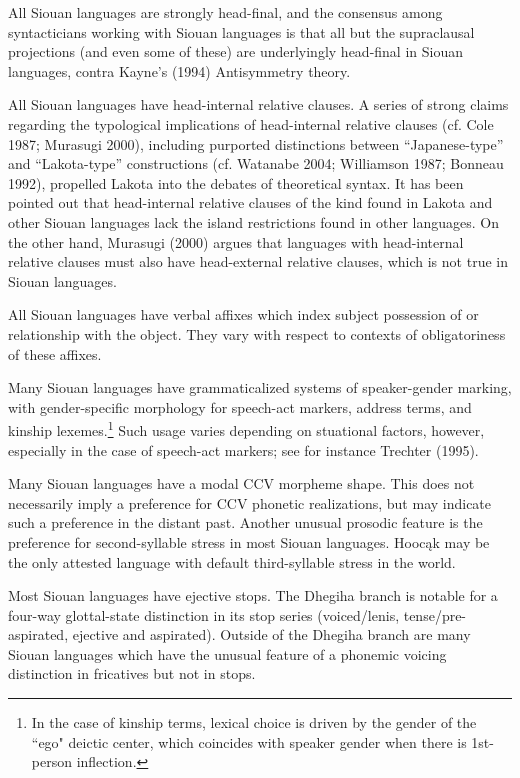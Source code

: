 \begin{refsection}
All Siouan languages are strongly head-final, and the consensus among syntacticians working with Siouan languages is that all but the supraclausal projections (and even some of these) are underlyingly head-final in Siouan languages, contra Kayne's (1994) Antisymmetry theory.


All Siouan languages have head-internal relative clauses. A series of strong claims regarding the typological implications of head-internal relative clauses (cf. Cole 1987; Murasugi 2000), including purported distinctions between ``Japanese-type'' and ``Lakota-type'' constructions (cf. Watanabe 2004; Williamson 1987; Bonneau 1992), propelled Lakota into the debates of theoretical syntax. It has been pointed out that head-internal relative clauses of the kind found in Lakota and other Siouan languages lack the island restrictions found in other languages. On the other hand, Murasugi (2000) argues that languages with head-internal relative clauses must also have head-external relative clauses, which is not true in Siouan languages.


All Siouan languages have verbal affixes which index subject possession of or relationship with the object. They vary with respect to contexts of obligatoriness of these affixes.


Many Siouan languages have grammaticalized systems of speaker-gender marking, with gender-specific morphology for speech-act markers, address terms, and kinship lexemes.\footnote{In the case of kinship terms, lexical choice is driven by the gender of the ``ego" deictic center, which coincides with speaker gender when there is 1st-person inflection.} Such usage varies depending on stuational factors, however, especially in the case of speech-act markers; see for instance Trechter (1995).   


Many Siouan languages have a modal CCV morpheme shape. This does not necessarily imply a preference for CCV phonetic realizations, but may indicate such a preference in the distant past. Another unusual prosodic feature is the preference for second-syllable stress in most Siouan languages. Hooc\k{a}k may be the only attested language with default third-syllable stress in the world.


Most Siouan languages have ejective stops. The Dhegiha branch is notable for a four-way glottal-state distinction in its stop series (voiced/lenis, tense/pre-aspirated, ejective and aspirated). Outside of the Dhegiha branch are many Siouan languages which have the unusual feature of a phonemic voicing distinction in fricatives but not in stops.



\end{refsection}
